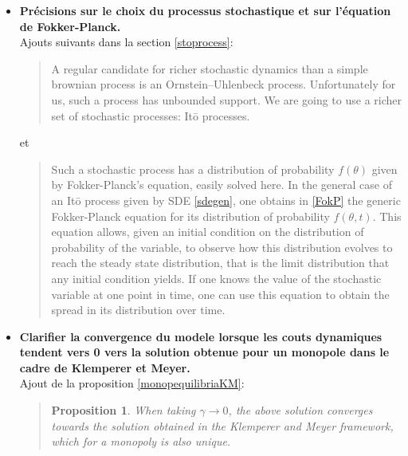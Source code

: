 \documentclass{article}
\newtheorem{proposition}[theorem]{Proposition}
\begin{document}
\begin{itemize}
\item \textbf{Précisions sur le choix du processus stochastique et sur l'équation de Fokker-Planck.}\\

Ajouts suivants dans la section \ref{stoprocess}:

\begin{quote}
A regular candidate for richer stochastic dynamics than a simple brownian process is an Ornstein–Uhlenbeck process. Unfortunately for us, such a process has unbounded support. We are going to use a richer set of stochastic processes: It\={o} processes. 
\end{quote}
et
\begin{quote}
Such a stochastic process has a distribution of probability $f(\theta)$ given by Fokker-Planck's equation, easily solved here. In the general case of an It\={o} process given by SDE \ref{sdegen}, one obtains in \ref{FokP} the generic Fokker-Planck equation for its distribution of probability $f(\theta,t)$. This equation allows, given an initial condition on the distribution of probability of the variable, to observe how this distribution evolves to reach the steady state distribution, that is the limit distribution that any initial condition yields. If one knows the value of the stochastic variable at one point in time, one can use this equation to obtain the spread in its distribution over time. 
\end{quote}

\item \textbf{Clarifier la convergence du modele lorsque les couts dynamiques tendent vers 0 vers la solution obtenue pour un monopole dans le cadre de Klemperer et Meyer.}\\

Ajout de la proposition \ref{monopequilibriaKM}:
\begin{quote}
\begin{proposition}
When taking $\gamma\to 0$, the above solution converges towards the solution obtained in the Klemperer and Meyer framework, which for a monopoly is also unique.
\end{proposition}


\end{quote}
\end{itemize}
\end{document}
